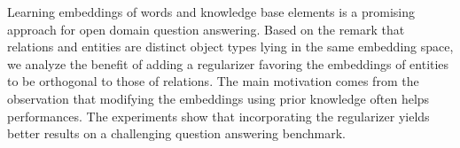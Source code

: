 Learning embeddings of words and knowledge base elements is a promising approach for open domain question answering. Based on the remark that relations and entities are distinct object types lying in the same embedding space, we analyze the benefit of adding a regularizer favoring the embeddings of entities to be orthogonal to those of relations. The main motivation comes from the observation that modifying the embeddings using prior knowledge often helps performances. The experiments show that incorporating the regularizer yields better results on a challenging question answering benchmark.
